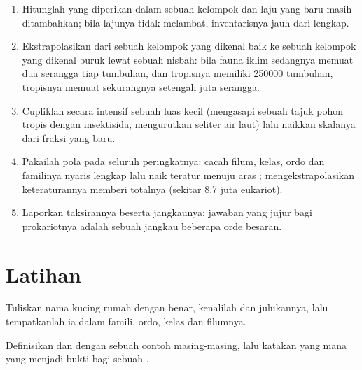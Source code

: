 \begin{method}\label{met:b1:classifying-biodiversity:estimate}
\begin{enumerate}
  \item Hitunglah  yang diperikan dalam sebuah kelompok dan
        laju yang baru masih ditambahkan; bila lajunya tidak melambat,
        inventarisnya jauh dari lengkap.
  \item Ekstrapolasikan dari sebuah kelompok yang dikenal baik ke
        sebuah kelompok yang dikenal buruk lewat sebuah nisbah: bila
        fauna iklim sedangnya memuat dua  serangga tiap 
        tumbuhan, dan tropisnya memiliki \num{250000} tumbuhan,
        tropisnya memuat sekurangnya setengah juta serangga.
  \item Cupliklah secara intensif sebuah luas kecil (mengasapi sebuah
        tajuk pohon tropis dengan insektisida, mengurutkan  seliter
        air laut) lalu naikkan skalanya dari fraksi  yang baru.
  \item Pakailah pola pada seluruh peringkatnya: cacah filum, kelas,
        ordo dan familinya nyaris lengkap lalu naik teratur menuju aras
        ; mengekstrapolasikan keteraturannya memberi totalnya
        (sekitar \num{8.7} juta eukariot).
  \item Laporkan taksirannya beserta jangkaunya; jawaban yang jujur
        bagi prokariotnya adalah sebuah jangkau beberapa orde besaran.
\end{enumerate}
\end{method}

\section{Latihan}

\begin{exercise}[$\star$]\label{exo:b1:classifying-biodiversity:1}
Tuliskan nama kucing rumah dengan benar, kenalilah  dan
julukannya, lalu tempatkanlah ia dalam famili, ordo, kelas dan
filumnya.
\end{exercise}

\begin{exercise}[$\star$]\label{exo:b1:classifying-biodiversity:2}
Definisikan  dan  dengan sebuah contoh
masing-masing, lalu katakan yang mana yang menjadi bukti bagi sebuah
.
\end{exercise}

